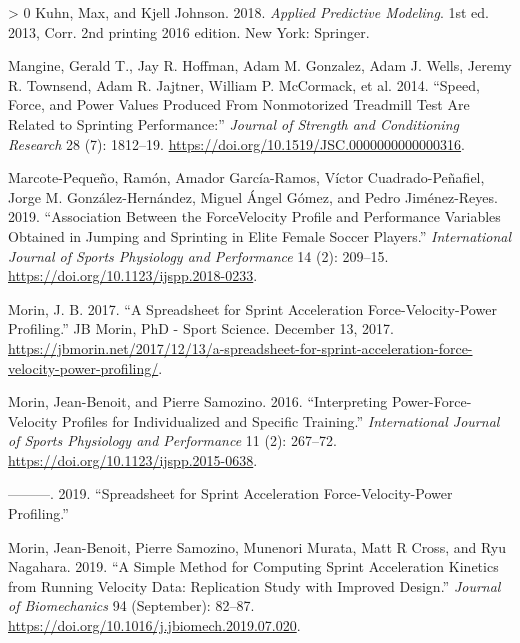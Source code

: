 \documentclass[fleqn,10pt,lineno]{wlpeerj} %
\newlength{\cslhangindent}
\newenvironment{CSLReferences}[3] %
 {%
  \setlength{\parindent}{0pt}
  \ifodd #1 \everypar{\setlength{\hangindent}{\cslhangindent}}\ignorespaces\fi
  \ifnum #2 > 0
  \setlength{\parskip}{#2\baselineskip}
  \fi
 }%
 {}
\begin{document}
\begin{CSLReferences}{1}{0}
\leavevmode\hypertarget{ref-kuhnAppliedPredictiveModeling2018}{}%
Kuhn, Max, and Kjell Johnson. 2018. \emph{Applied {Predictive Modeling}}. 1st ed. 2013, Corr. 2nd printing 2016 edition. {New York}: {Springer}.

\leavevmode\hypertarget{ref-mangineSpeedForcePower2014}{}%
Mangine, Gerald T., Jay R. Hoffman, Adam M. Gonzalez, Adam J. Wells, Jeremy R. Townsend, Adam R. Jajtner, William P. McCormack, et al. 2014. {``Speed, {Force}, and {Power Values Produced From Nonmotorized Treadmill Test Are Related} to {Sprinting Performance}:''} \emph{Journal of Strength and Conditioning Research} 28 (7): 1812--19. \url{https://doi.org/10.1519/JSC.0000000000000316}.

\leavevmode\hypertarget{ref-marcote-pequenoAssociationForceVelocity2019}{}%
Marcote-Pequeño, Ramón, Amador García-Ramos, Víctor Cuadrado-Peñafiel, Jorge M. González-Hernández, Miguel Ángel Gómez, and Pedro Jiménez-Reyes. 2019. {``Association {Between} the {Force}{{Velocity Profile}} and {Performance Variables Obtained} in {Jumping} and {Sprinting} in {Elite Female Soccer Players}.''} \emph{International Journal of Sports Physiology and Performance} 14 (2): 209--15. \url{https://doi.org/10.1123/ijspp.2018-0233}.

\leavevmode\hypertarget{ref-morinSpreadsheetSprintAcceleration2017}{}%
Morin, J. B. 2017. {``A Spreadsheet for {Sprint} Acceleration {Force}-{Velocity}-{Power} Profiling.''} {JB Morin, PhD - Sport Science}. December 13, 2017. \url{https://jbmorin.net/2017/12/13/a-spreadsheet-for-sprint-acceleration-force-velocity-power-profiling/}.

\leavevmode\hypertarget{ref-morinInterpretingPowerForceVelocityProfiles2016}{}%
Morin, Jean-Benoit, and Pierre Samozino. 2016. {``Interpreting {Power}-{Force}-{Velocity Profiles} for {Individualized} and {Specific Training}.''} \emph{International Journal of Sports Physiology and Performance} 11 (2): 267--72. \url{https://doi.org/10.1123/ijspp.2015-0638}.

\leavevmode\hypertarget{ref-morinSpreadsheetSprintAcceleration2019}{}%
---------. 2019. {``Spreadsheet for {Sprint} Acceleration Force-Velocity-Power Profiling.''}

\leavevmode\hypertarget{ref-morinSimpleMethodComputing2019}{}%
Morin, Jean-Benoit, Pierre Samozino, Munenori Murata, Matt R Cross, and Ryu Nagahara. 2019. {``A Simple Method for Computing Sprint Acceleration Kinetics from Running Velocity Data: {Replication} Study with Improved Design.''} \emph{Journal of Biomechanics} 94 (September): 82--87. \url{https://doi.org/10.1016/j.jbiomech.2019.07.020}.


\end{CSLReferences}
\end{document}
